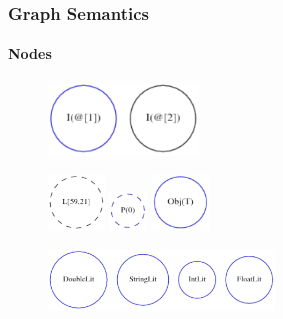 \documentclass[hyperref={pdfpagelabels=false}]{beamer}
\begin{document}
\begin{frame}
    \frametitle{Graph Semantics}
    \framesubtitle{Nodes}
    \begin{figure}[t]
        \includegraphics[width=40mm]{images/nodes/inodes.pdf}
    \end{figure}
    \begin{figure}[t]
        \includegraphics[width=15mm]{images/nodes/lnodes.pdf}
        \includegraphics[width=10mm]{images/nodes/pnodes.pdf}
        \includegraphics[width=15mm]{images/nodes/objnodes.pdf}
    \end{figure}
    \begin{figure}[t]
        \includegraphics[width=60mm]{images/nodes/litnodes.pdf}
    \end{figure}
\end{frame}
\end{document}
